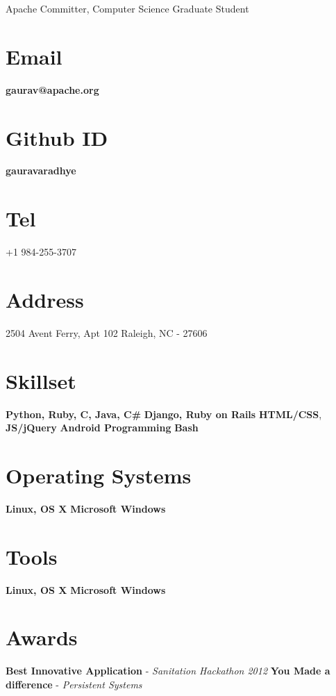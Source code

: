 \documentclass[]{friggeri-cv}
\begin{document}
      {Apache Committer, Computer Science Graduate Student}
      
\noindent\makebox[\linewidth]{\rule{\paperwidth}{0.4pt}}

\begin{aside}
\vspace{30 mm} \leavevmode
  \section{Email}
    \textbf{gaurav@apache.org}
    ~
  \section{Github ID}
    \textbf{gauravaradhye}
    ~
  \section{Tel}
    +1 984-255-3707
    ~
  \section{Address}
    2504 Avent Ferry, Apt 102
    Raleigh, NC - 27606
    ~
  \section{Skillset}
        \textbf{Python, Ruby, C, Java, C\#}
        \textbf{Django, Ruby on Rails}
        \textbf{HTML/CSS}, \textbf{JS/jQuery}
        \textbf{Android Programming}
        \textbf{Bash}
~
  \section{Operating Systems}
        \textbf{Linux, OS X}\leavevmode
        \textbf{Microsoft Windows}
~
  \section{Tools}
        \textbf{Linux, OS X}\leavevmode
        \textbf{Microsoft Windows}
~
  \section{Awards}
        \textbf{Best Innovative Application} -
        \emph{Sanitation Hackathon 2012}
        \vspace{1mm} \leavevmode
        \textbf{You Made a difference} -
        \emph{Persistent Systems}
~
\end{aside}
\end{document}
